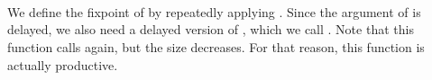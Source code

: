 \begin{code}%
\>[0]\AgdaSpace{}%
\AgdaSymbol{:}\AgdaSpace{}%
\AgdaSymbol{\{}\AgdaSpace{}%
\AgdaSymbol{:}\AgdaSpace{}%
\AgdaSymbol{\}}\AgdaSpace{}%
\AgdaSpace{}%
\AgdaSymbol{(}\AgdaSpace{}%
\AgdaSpace{}%
\AgdaSpace{}%
\AgdaSymbol{)}\AgdaSpace{}%
\AgdaSpace{}%
\AgdaSpace{}%
\<%
\\
\>[0]\AgdaSpace{}%
\AgdaSymbol{:}\AgdaSpace{}%
\AgdaSymbol{\{}\AgdaSpace{}%
\AgdaSymbol{:}\AgdaSpace{}%
\AgdaSymbol{\}}\AgdaSpace{}%
\AgdaSpace{}%
\AgdaSymbol{(}\AgdaSpace{}%
\AgdaSpace{}%
\AgdaSpace{}%
\AgdaSymbol{)}\AgdaSpace{}%
\AgdaSpace{}%
\AgdaSpace{}%
\AgdaSymbol{(}\AgdaSpace{}%
\AgdaSymbol{)}\<%
\\
\>[0]\AgdaSpace{}%
\AgdaSpace{}%
\AgdaSymbol{\{}\AgdaSymbol{\}}\AgdaSpace{}%
\AgdaSymbol{=}\AgdaSpace{}%
\AgdaSpace{}%
\AgdaSymbol{(}\AgdaSpace{}%
\AgdaSpace{}%
\AgdaSymbol{\{}\AgdaSymbol{\})}\<%
\\
\>[0]\AgdaSpace{}%
\AgdaSymbol{(}\AgdaSpace{}%
\AgdaSpace{}%
\AgdaSymbol{\{}\AgdaSymbol{\})}\AgdaSpace{}%
\AgdaSpace{}%
\AgdaSymbol{=}\AgdaSpace{}%
\AgdaSpace{}%
\AgdaSpace{}%
\AgdaSymbol{\{}\AgdaSymbol{\}}\<%
\end{code}

We define the fixpoint of  by repeatedly applying .
Since the argument of  is delayed, we also need a delayed version of , which we call .
Note that this function calls  again, but the size decreases.
For that reason, this function is actually productive.

